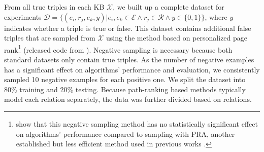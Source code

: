 \documentclass[letterpaper]{article} %
\def\authornote#1#2{{\color{#1}{\textsl{#2}}}}
\newcommand{\WL}[1]{\authornote{orange}{#1}}
\begin{document}
From all true triples in each KB $\mathcal{X}$, we built up a complete dataset for experiments $\mathcal{D} = \{ (e_i, r_j, e_k, y)|e_i, e_k\in \mathcal{E} \land  r_j \in \mathcal{R} \land y \in \{0, 1\}\}$, where $y$ indicates whether a triple is true or false. This dataset contains additional false triples that are sampled from $\mathcal{X}$ using the method based on personalized page rank\footnote{\citeauthor{sfe} show that this negative sampling method has no statistically significant effect on algorithms' performance compared to sampling with PRA, another established but less efficient method used in previous works \cite{pra,deeppath}.} (released code from \cite{sfe}). Negative sampling is necessary because both standard datasets only contain true triples. As the number of negative examples has a significant effect on algorithms' performance \cite{baselines_strike_back} and evaluation, we consistently sampled 10 negative examples for each positive one. We split the dataset into 80\% training and 20\% testing. Because path-ranking based methods typically model each relation separately, the data was further divided based on relations.


\end{document}
